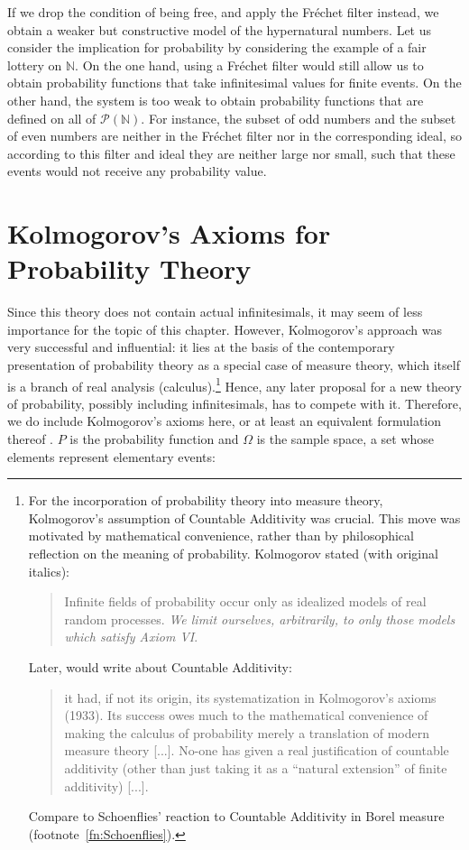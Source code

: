 If we drop the condition of being free, and apply the Fr\'{e}chet filter instead, we obtain a weaker but constructive model of the hypernatural numbers.
Let us consider the implication for probability by considering the example of a fair lottery on $\mathbb{N}$. On the one hand, using a Fr\'{e}chet filter would still allow us to obtain probability functions that take infinitesimal values for finite events. On the other hand, the system is too weak to obtain probability functions that are defined on all of $\mathcal{P}(\mathbb{N})$. For instance, the subset of odd numbers and the subset of even numbers are neither in the Fr\'{e}chet filter nor in the corresponding ideal, so according to this filter and ideal they are neither large nor small, such that these events would not receive any probability value.

\section{Kolmogorov's Axioms for Probability Theory}\label{sec:KolmAxioms}
Since this theory does not contain actual infinitesimals, it may seem of less importance for the topic of this chapter. However, Kolmogorov's approach was very successful and influential: it lies at the basis of the contemporary presentation of probability theory as a special case of measure theory, which itself is a branch of real analysis (calculus).\footnote{For the incorporation of probability theory into measure theory, Kolmogorov's assumption of Countable Additivity was crucial. This move was motivated by mathematical convenience, rather than by philosophical reflection on the meaning of probability. Kolmogorov stated (with original italics):
\begin{quote}
Infinite fields of probability occur only as idealized models of real random processes. \emph{We limit ourselves, arbitrarily, to only those models which satisfy Axiom VI}. \citep[p.~15]{Kolmogorov:1933}
\end{quote}
Later, \citet[Vol.~I, p.~119]{deFinetti:1974} would write about Countable Additivity:
\begin{quote}
it had, if not its origin, its systematization in Kolmogorov's axioms (1933). Its success owes much to the mathematical convenience of making the calculus of probability merely a translation of modern measure theory [...]. No-one has given a real justification of countable additivity (other than just taking it as a ``natural extension'' of finite additivity) [...].
\end{quote}
Compare to Schoenflies' reaction to Countable Additivity in Borel measure (footnote~\ref{fn:Schoenflies}).
} Hence, any later proposal for a new theory of probability, possibly including infinitesimals, has to compete with it. Therefore, we do include Kolmogorov's axioms here, or at least an equivalent formulation thereof \citep[taken from][]{Benci_etal:2013}. $P$ is the probability function and $\Omega$ is the sample space, a set whose elements represent elementary events:

